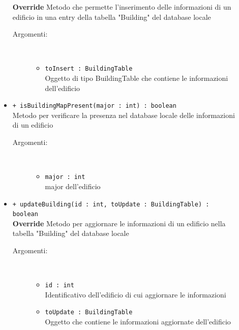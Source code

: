 \documentclass[../DefinizioneDiProdotto.tex]{subfiles}
\begin{document}
\begin{description}
\begin{itemize}
		\textbf{Override} Metodo che permette l'inserimento delle informazioni di un edificio in una entry della tabella "Building" del database locale
		\begin{description}
			\item[Argomenti:] \
			\begin{itemize}
				\item \texttt{toInsert : BuildingTable}\\
				Oggetto di tipo BuildingTable che contiene le informazioni dell'edificio\end{itemize}
		\end{description}
		\item \texttt{+ isBuildingMapPresent(major : int) : boolean}\\
		Metodo per verificare la presenza nel database locale delle informazioni di un edificio
		\begin{description}
			\item[Argomenti:] \
			\begin{itemize}
				\item \texttt{major : int}\\
				major dell'edificio\end{itemize}
		\end{description}
		\item \texttt{+ updateBuilding(id : int, toUpdate : BuildingTable) : boolean}\\
		\textbf{Override} Metodo per aggiornare le informazioni di un edificio nella tabella "Building" del database locale
		\begin{description}
			\item[Argomenti:] \
			\begin{itemize}
				\item \texttt{id : int}\\
				Identificativo dell'edificio di cui aggiornare le informazioni\item \texttt{toUpdate : BuildingTable}\\
				Oggetto che contiene le informazioni aggiornate dell'edificio\end{itemize}
		\end{description}
	\end{itemize}
\end{description}
\end{document}
